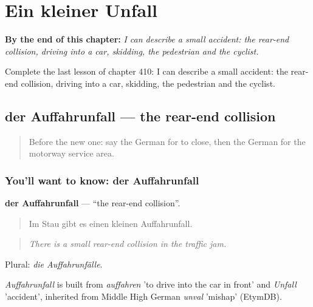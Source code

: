 
\chapter{Ein kleiner Unfall}
\label{ch:ge-ein-kleiner-unfall}

\begin{chapteropening}
\textbf{By the end of this chapter:} \emph{I can describe a small accident: the rear-end collision, driving into a car, skidding, the pedestrian and the cyclist.}

Complete the last lesson of chapter 410: I can describe a small accident: the rear-end collision, driving into a car, skidding, the pedestrian and the cyclist.
\end{chapteropening}

\section[der Auffahrunfall]{der Auffahrunfall — the rear-end collision}

\label{lesson:GE-C410-auffahrunfall}



\begin{quote}
Before the new one: say the German for to close, then the German for the motorway service area.
\end{quote}

\subsection*{You'll want to know: der Auffahrunfall}
\textbf{der Auffahrunfall} — \textquotedblleft{}the rear-end collision\textquotedblright{}.

\begin{quote}
Im Stau gibt es einen kleinen Auffahrunfall.
\end{quote}

\begin{quote}
\emph{There is a small rear-end collision in the traffic jam.}
\end{quote}

Plural: \emph{die Auffahrunfälle}.

\begin{cousinweb}
\emph{Auffahrunfall} is built from \emph{auffahren} 'to drive into the car in front' and \emph{Unfall} 'accident', inherited from Middle High German \emph{unval} 'mishap' (EtymDB).
\end{cousinweb}

